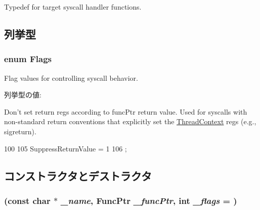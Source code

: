 Typedef for target syscall handler functions. 

\subsection{列挙型}
\hypertarget{classSyscallDesc_aa705cf7e79a21c2352b00ffe20cd295f}{
\subsubsection[{Flags}]{\setlength{\rightskip}{0pt plus 5cm}enum {\bf Flags}}}
\label{classSyscallDesc_aa705cf7e79a21c2352b00ffe20cd295f}


Flag values for controlling syscall behavior. \begin{Desc}
\item[列挙型の値: ]\par
\begin{description}
\item[{\em 
\hypertarget{classSyscallDesc_aa705cf7e79a21c2352b00ffe20cd295fab4992a2474f4af8a3274d2024ab0530e}{
SuppressReturnValue}
\label{classSyscallDesc_aa705cf7e79a21c2352b00ffe20cd295fab4992a2474f4af8a3274d2024ab0530e}
}]Don't set return regs according to funcPtr return value. Used for syscalls with non-\/standard return conventions that explicitly set the \hyperlink{classThreadContext}{ThreadContext} regs (e.g., sigreturn). \end{description}
\end{Desc}




\begin{DoxyCode}
100                {
105         SuppressReturnValue = 1
106     };
\end{DoxyCode}


\subsection{コンストラクタとデストラクタ}
\hypertarget{classSyscallDesc_abb73d8c1b9785087f5fbf7f8b01c0663}{
\subsubsection[{SyscallDesc}]{ (const char $\ast$ {\em \_\-name}, \/  {\bf FuncPtr} {\em \_\-funcPtr}, \/  int {\em \_\-flags} = {})}}
\label{classSyscallDesc_abb73d8c1b9785087f5fbf7f8b01c0663}


